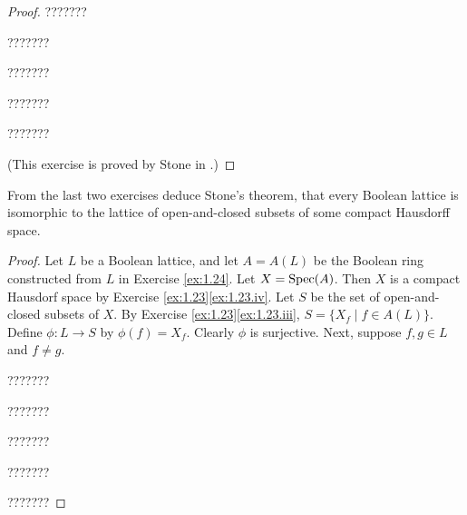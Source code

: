 \begin{proof}
???????



???????



???????



???????



???????



(This exercise is proved by Stone in \cite[Theorem 2]{StoneRepresentationOfBooleanAlgebras}.)
\end{proof}








\begin{exercise}
\label{ex:1.25}
From the last two exercises deduce Stone's theorem, that every Boolean lattice is isomorphic to the lattice of open-and-closed subsets of some compact Hausdorff space.
\end{exercise}

\begin{proof}
Let $L$ be a Boolean lattice, and let $A = A(L)$ be the Boolean ring constructed from $L$ in Exercise \ref{ex:1.24}.
Let $X = \operatorname{Spec}(A)$.
Then $X$ is a compact Hausdorf space by Exercise \ref{ex:1.23}\ref{ex:1.23.iv}.
Let $S$ be the set of open-and-closed subsets of $X$.
By Exercise \ref{ex:1.23}\ref{ex:1.23.iii}, $S = \{X_f \mid f \in A(L)\}$.
Define $\phi : L \to S$ by $\phi(f) = X_f$.
Clearly $\phi$ is surjective.
Next, suppose $f,g\in L$ and $f \neq g$.



???????



???????



???????



???????



???????










\end{proof}








